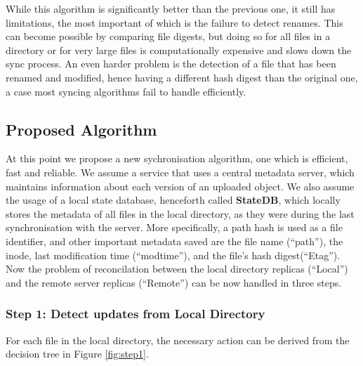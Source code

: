     While this algorithm is significantly better than the previous one, it still has limitations, the most important of which is the failure to detect renames. This can become possible by comparing file digests, but doing so for all files in a directory or for very large files is computationally expensive and slows down the sync process. An even harder problem is the detection of a file that has been renamed and modified, hence having a different hash digest than the original one, a case most syncing algorithms fail to handle efficiently.\\

  \subsection{Proposed Algorithm}
    \label{ssec:3step_algorithm}
    At this point we propose a new sychronisation algorithm, one which is efficient, fast and reliable. We assume a service that uses a central metadata server, which maintains information about each version of an uploaded object. We also assume the usage of a local state database, henceforth called \textbf{StateDB}, which locally stores the metadata of all files in the local directory, as they were during the last synchronisation with the server. More specifically, a path hash is used as a file identifier, and other important metadata saved are the file name (``path''), the inode, last modification time (``modtime''), and the file's hash digest(``Etag''). Now the problem of reconcilation between the local directory replicas (``Local'') and the remote server replicas (``Remote'') can be now handled in three steps.

    \subsubsection{Step 1: Detect updates from Local Directory}
      For each file in the local directory, the necessary action can be derived from the decision tree in Figure \ref{fig:step1}.

